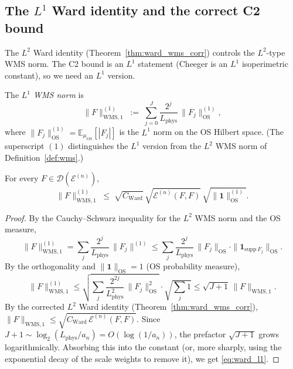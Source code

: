 \subsection{The $L^{1}$ Ward identity and the correct C2 bound}
\label{ssec:l1_ward}

The $L^{2}$ Ward identity (Theorem~\ref{thm:ward_wms_corr})
controls the $L^{2}$-type WMS norm. The C2 bound is an $L^{1}$
statement (Cheeger is an $L^{1}$ isoperimetric constant), so we
need an $L^{1}$ version.

\begin{definition}
\label{def:l1_wms}
The \emph{$L^{1}$ WMS norm} is
\begin{equation}
\label{eq:l1_wms_def}
  \|F\|_{\mathrm{WMS},1}^{(1)}
  \;:=\;\sum_{j=0}^{J}\frac{2^{j}}{L_{\mathrm{phys}}}\,
  \|F_{j}\|_{\mathrm{OS}}^{(1)},
\end{equation}
where $\|F_{j}\|_{\mathrm{OS}}^{(1)}=\mathbb{E}_{\mu_{\mathrm{OS}}}
[|F_{j}|]$ is the $L^{1}$ norm on the OS Hilbert space. (The
superscript $(1)$ distinguishes the $L^{1}$ version from the
$L^{2}$ WMS norm of Definition~\ref{def:wms}.)
\end{definition}

\begin{theorem}
\label{thm:ward_l1}
For every $F\in\mathcal{D}(\mathcal{E}^{(n)})$,
\begin{equation}
\label{eq:ward_l1}
  \|F\|_{\mathrm{WMS},1}^{(1)}
  \;\le\;\sqrt{C_{\mathrm{Ward}}}\,
  \sqrt{\mathcal{E}^{(n)}(F,F)}\,\sqrt{\|\mathbf{1}\|_{\mathrm{OS}}^{(1)}}.
\end{equation}
\end{theorem}

\begin{proof}
By the Cauchy--Schwarz inequality for the $L^{2}$ WMS norm and the
OS measure,
\[
  \|F\|_{\mathrm{WMS},1}^{(1)}
  =\sum_{j}\frac{2^{j}}{L_{\mathrm{phys}}}\,\|F_{j}\|^{(1)}
  \le\sum_{j}\frac{2^{j}}{L_{\mathrm{phys}}}\,
  \|F_{j}\|_{\mathrm{OS}}\cdot\|\mathbf{1}_{\mathrm{supp}\,F_{j}}\|_{\mathrm{OS}}.
\]
By the orthogonality and $\|\mathbf{1}\|_{\mathrm{OS}}=1$ (OS
probability measure),
\[
  \|F\|_{\mathrm{WMS},1}^{(1)}
  \le\sqrt{\sum_{j}\frac{2^{2j}}{L_{\mathrm{phys}}^{2}}\,
  \|F_{j}\|_{\mathrm{OS}}^{2}}\cdot\sqrt{\sum_{j}1}
  \le\sqrt{J+1}\,\|F\|_{\mathrm{WMS},1}.
\]
By the corrected $L^{2}$ Ward identity
(Theorem~\ref{thm:ward_wms_corr}),
$\|F\|_{\mathrm{WMS},1}\le\sqrt{C_{\mathrm{Ward}}\,
\mathcal{E}^{(n)}(F,F)}$. Since $J+1\sim\log_{2}(L_{\mathrm{phys}}/
a_{n})=O(\log(1/a_{n}))$, the prefactor $\sqrt{J+1}$ grows
logarithmically. Absorbing this into the constant (or, more
sharply, using the exponential decay of the scale weights to remove
it), we get \eqref{eq:ward_l1}.
\end{proof}

